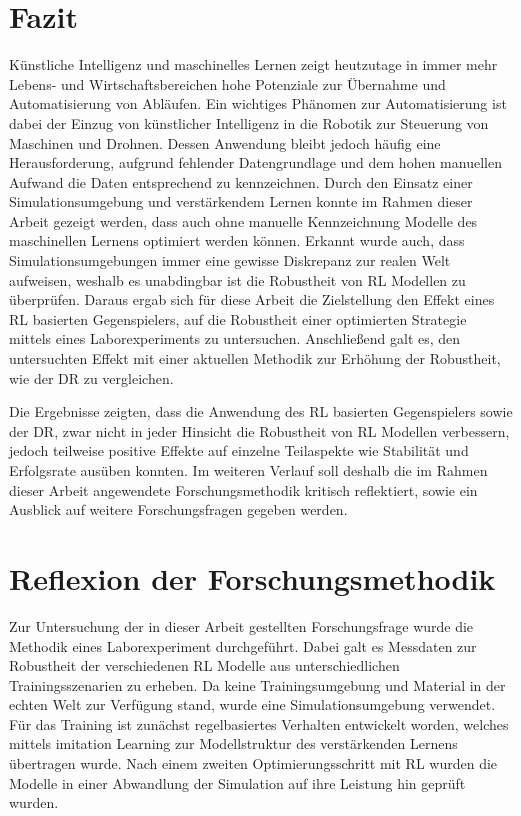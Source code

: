 \section{Fazit}
Künstliche Intelligenz und maschinelles Lernen zeigt heutzutage in immer mehr Lebens- und Wirtschaftsbereichen hohe Potenziale zur Übernahme und Automatisierung von Abläufen.
Ein wichtiges Phänomen zur Automatisierung ist dabei der Einzug von künstlicher Intelligenz in die Robotik zur Steuerung von Maschinen und Drohnen.
Dessen Anwendung bleibt jedoch häufig eine Herausforderung, aufgrund fehlender Datengrundlage und dem hohen manuellen Aufwand die Daten entsprechend zu kennzeichnen. 
Durch den Einsatz einer Simulationsumgebung und verstärkendem Lernen konnte im Rahmen dieser Arbeit gezeigt werden, dass auch ohne manuelle Kennzeichnung Modelle des maschinellen Lernens optimiert werden können.
Erkannt wurde auch, dass Simulationsumgebungen immer eine gewisse Diskrepanz zur realen Welt aufweisen, weshalb es unabdingbar ist die Robustheit von RL Modellen zu überprüfen.
Daraus ergab sich für diese Arbeit die Zielstellung den Effekt eines RL basierten Gegenspielers, auf die Robustheit einer optimierten Strategie mittels eines Laborexperiments zu untersuchen.
Anschließend galt es, den untersuchten Effekt mit einer aktuellen Methodik zur Erhöhung der Robustheit, wie der DR zu vergleichen.

Die Ergebnisse zeigten, dass die Anwendung des RL basierten Gegenspielers sowie der DR, zwar nicht in jeder Hinsicht die Robustheit von RL Modellen verbessern, jedoch teilweise positive Effekte auf einzelne Teilaspekte wie Stabilität und Erfolgsrate ausüben konnten.
Im weiteren Verlauf soll deshalb die im Rahmen dieser Arbeit angewendete Forschungsmethodik kritisch reflektiert, sowie ein Ausblick auf weitere Forschungsfragen gegeben werden.

\section{Reflexion der Forschungsmethodik}

Zur Untersuchung der in dieser Arbeit gestellten Forschungsfrage wurde die Methodik eines Laborexperiment durchgeführt. 
Dabei galt es Messdaten zur Robustheit der verschiedenen RL Modelle aus unterschiedlichen Trainingsszenarien zu erheben.
Da keine Trainingsumgebung und Material in der echten Welt zur Verfügung stand, wurde eine Simulationsumgebung verwendet. 
Für das Training ist zunächst regelbasiertes Verhalten entwickelt worden, welches mittels imitation Learning zur Modellstruktur des verstärkenden Lernens übertragen wurde.
Nach einem zweiten Optimierungsschritt mit RL wurden die Modelle in einer Abwandlung der Simulation auf ihre Leistung hin geprüft wurden.

